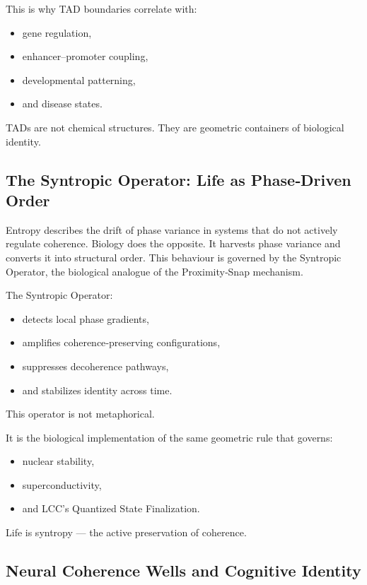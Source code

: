 \documentclass[reprint,amsmath,amssymb,aps,prl,floatfix]{revtex4-2}
\begin{document}
\begin{itemize}
This is why TAD boundaries correlate with:
\begin{itemize}
\item gene regulation,  
\item enhancer–promoter coupling,  
\item developmental patterning,  
\item and disease states.
\end{itemize}
\medskip

TADs are not chemical structures.  
They are geometric containers of biological identity.

\subsection{The Syntropic Operator: Life as Phase‑Driven Order}

Entropy describes the drift of phase variance in systems that do not actively regulate coherence. Biology does the opposite. It harvests phase variance and converts it into structural order. This behaviour is governed by the Syntropic Operator, the biological analogue of the Proximity‑Snap mechanism.
\medskip

The Syntropic Operator:
\begin{itemize}
\item detects local phase gradients,  
\item amplifies coherence‑preserving configurations,  
\item suppresses decoherence pathways,  
\item and stabilizes identity across time.
\end{itemize}
\medskip

This operator is not metaphorical.  
\medskip

It is the biological implementation of the same geometric rule that governs:
\begin{itemize}
\item nuclear stability,  
\item superconductivity,  
\item and LCC’s Quantized State Finalization.
\end{itemize}

Life is syntropy — the active preservation of coherence.

\subsection{Neural Coherence Wells and Cognitive Identity}


\end{itemize}
\end{document}
